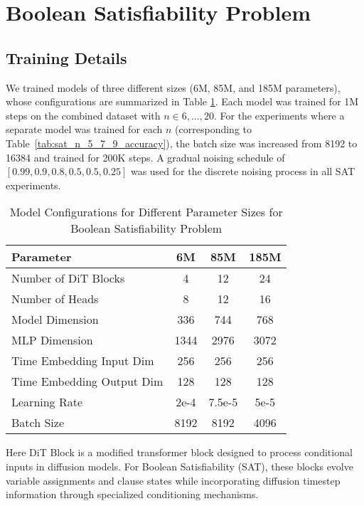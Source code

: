 \section{Boolean Satisfiability Problem}
\label{app:3sat}

\subsection{Training Details} 
\label{app:sat_train_details}

We trained models of three different sizes (6M, 85M, and 185M parameters), whose configurations are summarized in Table \ref{tab:sat_model_configuration}. Each model was trained for 1M steps on the combined dataset with $n\in {6,\dots,20}$. For the experiments where a separate model was trained for each $n$ (corresponding to Table~\ref{tab:sat_n_5_7_9_accuracy}), the batch size was increased from 8192 to 16384 and trained for 200K steps.
A gradual noising schedule of $[0.99, 0.9, 0.8, 0.5, 0.5, 0.25]$ was used for the discrete noising process in all SAT experiments.
\begin{table}[ht]
\centering
\begin{tabular}{lccc}
\toprule
\textbf{Parameter} & \textbf{6M} & \textbf{85M} & \textbf{185M} \\
\midrule
Number of DiT Blocks & 4 & 12 & 24 \\
Number of Heads & 8 & 12 & 16 \\
Model Dimension & 336 & 744 & 768 \\
MLP Dimension & 1344 & 2976 & 3072 \\
Time Embedding Input Dim & 256 & 256 & 256 \\
Time Embedding Output Dim & 128 & 128 & 128 \\
Learning Rate & 2e-4 & 7.5e-5 & 5e-5 \\
Batch Size & 8192 & 8192 & 4096 \\
\bottomrule
\end{tabular}
\caption{Model Configurations for Different Parameter Sizes for Boolean Satisfiability Problem}
\label{tab:sat_model_configuration}
\end{table}

Here DiT Block \cite{peebles2023scalable} is a modified transformer block designed to process conditional inputs in diffusion models. For Boolean Satisfiability (SAT), these blocks evolve variable assignments and clause states while incorporating diffusion timestep information through specialized conditioning mechanisms.\\

